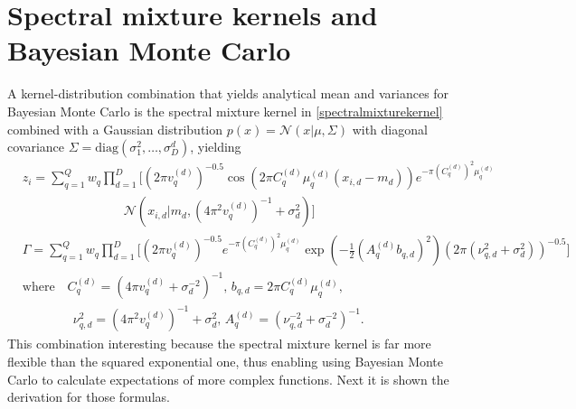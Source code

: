 \chapter{Spectral mixture kernels and Bayesian Monte Carlo}
A kernel-distribution combination that yields analytical mean and variances for Bayesian Monte Carlo is the spectral mixture kernel in \eqref{spectralmixturekernel} combined with a Gaussian distribution $p(x) = \mathcal{N}(x|\mu,\Sigma)$ with diagonal covariance $\Sigma = \text{diag}(\sigma_1^2,\ldots,\sigma_D^{d})$, yielding 
\begin{equation}
\begin{split}
& z_i = \sum_{q=1}^Q w_q \prod_{d=1}^D \bigg[(2 \pi v_q^{(d)})^{-0.5} \cos\left(2 \pi C_{q}^{(d)} \mu_q^{(d)}(x_{i,d} - m_{d})\right) e^{-\pi (C_q^{(d)})^2 \mu_q^{(d)}} \\
& \qquad \qquad \qquad \qquad \mathcal{N}(x_{i,d}|m_d,(4\pi^2v_q^{(d)})^{-1}+\sigma_d^2)\bigg] \\
& \Gamma = \sum_{q=1}^Q w_q \prod_{d=1}^D \bigg[ (2 \pi v_q^{(d)})^{-0.5} e^{-\pi (C_q^{(d)})^2 \mu_q^{(d)}}
\exp\left(-\frac{1}{2} (A_q^{(d)} b_{q,d})^2 \right) (2\pi(\nu_{q,d}^2 + \sigma_d^2))^{-0.5}\bigg] \\
& \text{where} \quad C_{q}^{(d)} = (4 \pi v_q^{(d)} + \sigma_d^{-2})^{-1}, \, b_{q,d} = 2 \pi C_{q}^{(d)} \mu_q^{(d)} ,\, \\
& \qquad \qquad \nu_{q,d}^2 = (4\pi^2v_q^{(d)})^{-1}+\sigma_d^2 ,\, A_q^{(d)} = (\nu_{q,d}^{-2} + \sigma_d^{-2})^{-1}.
\end{split}
\end{equation}
This combination interesting because the spectral mixture kernel is far more flexible than the squared exponential one, thus enabling using Bayesian Monte Carlo to calculate expectations of more complex functions. Next it is shown the derivation for those formulas.

